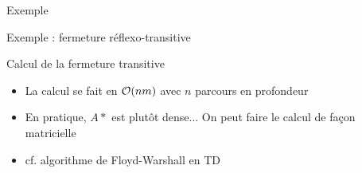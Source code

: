 \begin{frame}{Exemple}
\begin{center}
    
\end{center}
\end{frame}

\begin{frame}{Exemple : fermeture réflexo-transitive}
\begin{center}
    
\end{center}
    \end{frame}

\begin{frame}{Calcul de la fermeture transitive}
\begin{itemize}
    \item La calcul se fait en ${\cal O}(nm)$ avec $n$ parcours en profondeur
    \item En pratique, $A*$ est plutôt dense... On peut faire le calcul de façon matricielle
    \item cf. algorithme de Floyd-Warshall en TD 
\end{itemize}
\end{frame}